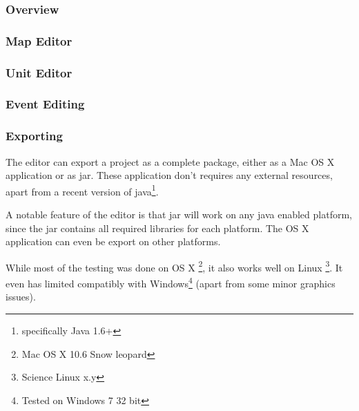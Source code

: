 \subsubsection{Overview}
\label{ssub:overview}

\subsubsection{Map Editor}
\label{ssub:map_editor}

\subsubsection{Unit Editor}
\label{ssub:unit_editors}

\subsubsection{Event Editing}

\subsubsection{Exporting}
\label{ssub:exporting}

The editor can export a project as a complete package, either as a Mac OS X application or as jar. These application don't requires any external resources, apart from a recent version of java\footnote{specifically Java 1.6+}.

A notable feature of the editor is that jar will work on any java enabled platform, since the jar contains all required libraries for each platform. The OS X application can even be export on other platforms.

While most of the testing was done on OS X \footnote{Mac OS X 10.6 Snow leopard}, it also works well on Linux \footnote{Science  Linux x.y}. It even has limited compatibly with Windows\footnote{Tested on Windows 7 32 bit} (apart from some minor graphics issues).
